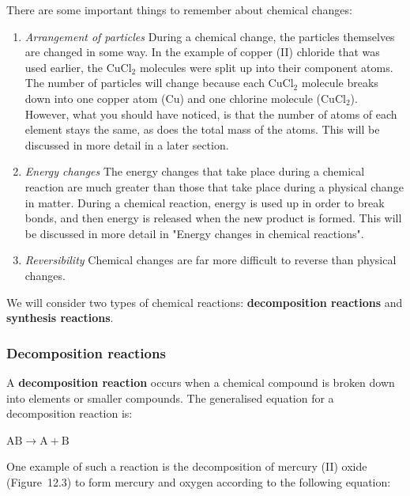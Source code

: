       \label{m38709*id62865}There are some important things to remember about chemical changes:\par 
      \label{m38709*id62869}\begin{enumerate}[noitemsep, label=\textbf{\arabic*}. ] 
            \label{m38709*uid6}\item \textsl{Arrangement of particles}\newline
During a chemical change, the particles themselves are changed in some way. In the example of copper (II) chloride that was used earlier, the $\mathrm{CuCl}{}_{2}$ molecules were split up into their component atoms. The number of particles will change because each $\mathrm{CuCl}{}_{2}$ molecule breaks down into one copper atom ($\mathrm{Cu}$) and one chlorine molecule ($\mathrm{CuCl}{}_{2}$). However, what you should have noticed, is that the number of atoms of each element stays the same, as does the total mass of the atoms. This will be discussed in more detail in a later section.
\label{m38709*uid7}\item \textsl{Energy changes}\newline
The energy changes that take place during a chemical reaction are much greater than those that take place during a physical change in matter. During a chemical reaction, energy is used up in order to break bonds, and then energy is released when the new product is formed. This will be discussed in more detail in "Energy changes in chemical reactions".
\label{m38709*uid8}\item \textsl{Reversibility}\newline
Chemical changes are far more difficult to reverse than physical changes.
\end{enumerate}
      \label{m38709*id62997}We will consider two types of chemical reactions: \textbf{decomposition reactions} and \textbf{synthesis reactions}.\par 
      \label{m38709*uid9}
            \subsubsection{ Decomposition reactions}
            \nopagebreak
            \label{m38709*id63019}A \textbf{decomposition reaction} occurs when a chemical compound is broken down into elements or smaller compounds. The generalised equation for a decomposition reaction is:\par 
        \label{m38709*id63029}$\mathrm{AB}\to \mathrm{A}+\mathrm{B}$\par 
        \label{m38709*id63040}One example of such a reaction is the decomposition of mercury (II) oxide (Figure~12.3) to form mercury and oxygen according to the following equation:
\label{m38709*id734}\nopagebreak\noindent{}

